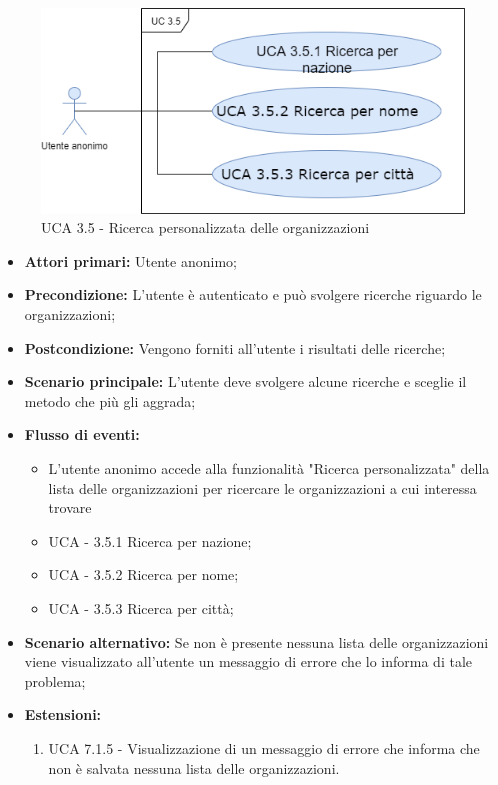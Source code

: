 \begin{figure}[h]
	\centering
	
	\includegraphics[scale=0.5]{sezioni/UseCase/Immagini/UCA3.5.png}
	\caption{UCA 3.5 - Ricerca personalizzata delle organizzazioni}
\end{figure}

\begin{itemize}
	\item \textbf{Attori primari:} Utente anonimo;
	\item \textbf{Precondizione:} L'utente è autenticato e può svolgere ricerche riguardo le organizzazioni;
	\item \textbf{Postcondizione:} Vengono forniti all'utente i risultati delle ricerche;
	\item \textbf{Scenario principale:} L'utente deve svolgere alcune ricerche e sceglie il metodo che più gli aggrada;
	\item \textbf{Flusso di eventi:} 
	\begin{itemize}
		\item L'utente anonimo accede alla funzionalità "Ricerca personalizzata" della lista delle organizzazioni per ricercare le organizzazioni a cui interessa trovare
		\item UCA - 3.5.1 Ricerca per nazione;
		\item UCA - 3.5.2 Ricerca per nome;
		\item UCA - 3.5.3 Ricerca per città;
	\end{itemize}
	\item \textbf{Scenario alternativo:} Se non è presente nessuna lista delle organizzazioni viene visualizzato all'utente un messaggio di errore che lo informa di tale problema;
	\item \textbf{Estensioni:}
	\begin{enumerate}
		\item UCA 7.1.5 - Visualizzazione di un messaggio di errore che informa che non è salvata nessuna lista delle organizzazioni.
	\end{enumerate}
\end{itemize}

